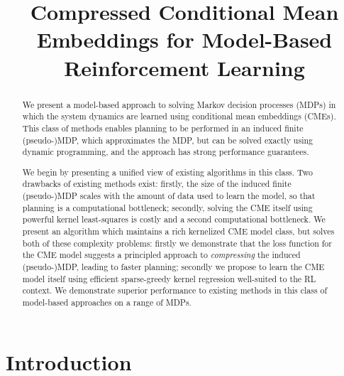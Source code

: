 \documentclass[letterpaper]{article}
\begin{document}
%
\title{Compressed Conditional Mean Embeddings for Model-Based Reinforcement Learning}
\maketitle

\begin{abstract} We present a model-based approach to solving Markov decision processes (MDPs) in which the system dynamics are learned using conditional mean embeddings (CMEs). This class of methods enables planning to be performed in an induced finite (pseudo-)MDP, which approximates the MDP, but can be solved exactly using dynamic programming, and the approach has strong performance guarantees.

We begin by presenting a unified view of existing algorithms in this class. Two drawbacks of existing methods exist: firstly, the size of the induced finite (pseudo-)MDP scales with the amount of data used to learn the model, so that planning is a computational bottleneck; secondly, solving the CME itself using powerful kernel least-squares is costly and a second computational bottleneck. We present an algorithm which maintains a rich kernelized CME model class, but solves both of these complexity problems: firstly we demonstrate that the loss function for the CME model suggests a principled approach to \emph{compressing} the induced (pseudo-)MDP, leading to faster planning; secondly we propose to learn the CME model itself using efficient sparse-greedy kernel regression well-suited to the RL context. We demonstrate superior performance to existing methods in this class of model-based approaches on a range of MDPs.
\end{abstract}

\section{Introduction}
\end{document}
